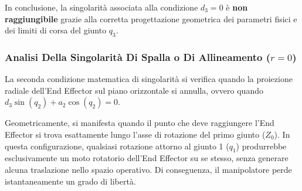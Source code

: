 ﻿\documentclass[11pt, a4paper]{article}
\begin{document}
In conclusione, la singolarità associata alla condizione $d_3 = 0$ è \textbf{non raggiungibile} grazie alla corretta progettazione geometrica dei parametri fisici e dei limiti di corsa del giunto $q_3$.

\subsubsection*{Analisi Della Singolarità Di Spalla o Di Allineamento ($r = 0$)}
La seconda condizione matematica di singolarità si verifica quando la proiezione radiale dell'End Effector sul piano orizzontale si annulla, ovvero quando $d_3 \sin(q_2) + a_2 \cos(q_2) = 0$.

Geometricamente, si manifesta quando il punto che deve raggiungere l'End Effector si trova esattamente lungo l'asse di rotazione del primo giunto ($Z_0$). In questa configurazione, qualsiasi rotazione attorno al giunto 1 ($q_1$) produrrebbe esclusivamente un moto rotatorio dell'End Effector su se stesso, senza generare alcuna traslazione nello spazio operativo. Di conseguenza, il manipolatore perde istantaneamente un grado di libertà.
\end{document}
